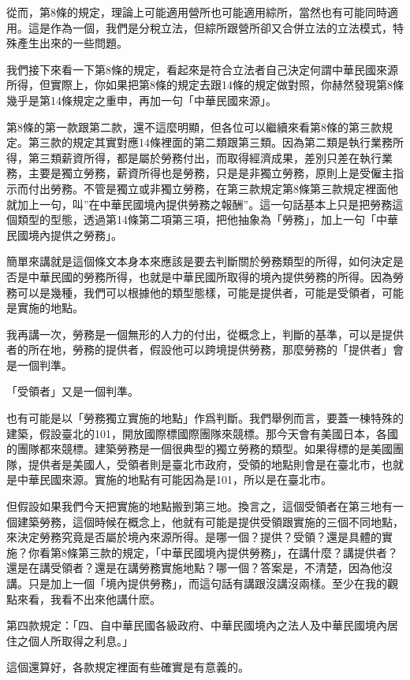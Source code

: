 \documentclass[oneside,sub3section]{ctexbook}
\begin{document}
從而，第8條的規定，理論上可能適用營所也可能適用綜所，當然也有可能同時適用。這是作為一個，我們是分稅立法，但綜所跟營所卻又合併立法的立法模式，特殊產生出來的一些問題。

我們接下來看一下第8條的規定，看起來是符合立法者自己決定何謂中華民國來源所得，但實際上，你如果把第8條的規定去跟14條的規定做對照，你赫然發現第8條幾乎是第14條規定之重申，再加一句「中華民國來源」。

第8條的第一款跟第二款，還不這麼明顯，但各位可以繼續來看第8條的第三款規定。第三款的規定其實對應14條裡面的第二類跟第三類。因為第二類是執行業務所得，第三類薪資所得，都是屬於勞務付出，而取得經濟成果，差別只差在執行業務，主要是獨立勞務，薪資所得也是勞務，只是是非獨立勞務，原則上是受僱主指示而付出勞務。不管是獨立或非獨立勞務，在第三款規定第8條第三款規定裡面他就加上一句，叫''在中華民國境內提供勞務之報酬''。這一句話基本上只是把勞務這個類型的型態，透過第14條第二項第三項，把他抽象為「勞務」，加上一句「中華民國境內提供之勞務」。

簡單來講就是這個條文本身本來應該是要去判斷關於勞務類型的所得，如何決定是否是中華民國的勞務所得，也就是中華民國所取得的境內提供勞務的所得。因為勞務可以是幾種，我們可以根據他的類型態樣，可能是提供者，可能是受領者，可能是實施的地點。

我再講一次，勞務是一個無形的人力的付出，從概念上，判斷的基準，可以是提供者的所在地，勞務的提供者，假設他可以跨境提供勞務，那麼勞務的「提供者」會是一個判準。

「受領者」又是一個判準。

也有可能是以「勞務獨立實施的地點」作爲判斷。我們舉例而言，要蓋一棟特殊的建築，假設臺北的101，開放國際標國際團隊來競標。那今天會有美國日本，各國的團隊都來競標。建築勞務是一個很典型的獨立勞務的類型。如果得標的是美國團隊，提供者是美國人，受領者則是臺北市政府，受領的地點則會是在臺北市，也就是中華民國來源。實施的地點有可能因為是101，所以是在臺北市。

但假設如果我們今天把實施的地點搬到第三地。換言之，這個受領者在第三地有一個建築勞務，這個時候在概念上，他就有可能是提供受領跟實施的三個不同地點，來決定勞務究竟是否屬於境內來源所得。是哪一個？提供？受領？還是具體的實施？你看第8條第三款的規定，「中華民國境內提供勞務」，在講什麼？講提供者？還是在講受領者？還是在講勞務實施地點？哪一個？答案是，不清楚，因為他沒講。只是加上一個「境內提供勞務」，而這句話有講跟沒講沒兩樣。至少在我的觀點來看，我看不出來他講什麽。

第四款規定：「四、自中華民國各級政府、中華民國境內之法人及中華民國境內居住之個人所取得之利息。」

這個還算好，各款規定裡面有些確實是有意義的。
\end{document}
